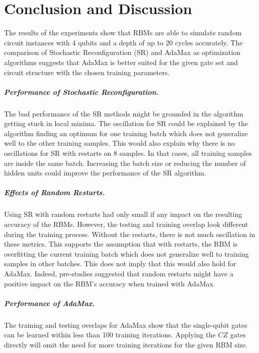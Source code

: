 \chapter{Conclusion and Discussion}
\label{sec:discussion}

The results of the experiments show that RBMs are able to simulate random circuit 
instances with 4 qubits and a depth of up to 20 cycles accurately. The comparison of 
Stochastic Reconfiguration (SR) and AdaMax as optimization algorithms suggests that 
AdaMax is better suited for the given gate set and circuit structure with the chosen training 
parameters. 

\paragraph{Performance of Stochastic Reconfiguration.}
The bad performance of the SR methods might be grounded in the algorithm getting stuck in 
local minima. The oscillation for SR could be explained by the algorithm finding an 
optimum for one training batch which does not generalize well to the other training samples.
This would also explain why there is no oscillations for SR with restarts on 8 samples. In that
cases, all training samples are inside the same batch. Increasing the batch size or reducing the 
number of hidden units could improve the performance of the SR algorithm.

\paragraph{Effects of Random Restarts.}
Using SR with random restarts had only small if any 
impact on the resulting accuracy of the RBMs. However, the testing and training overlap 
look different during the training process. Without the restarts, there is not much 
oscillation in these metrics. This supports the assumption that with restarts, the 
RBM is overfitting the current training batch which does not generalize well to training 
samples in other batches. This does not imply that this would also 
hold for AdaMax. Indeed, pre-studies suggested that random restarts might have a positive 
impact on the RBM's accuracy when trained with AdaMax.

\paragraph{Performance of AdaMax.}
The training and testing overlaps for AdaMax show that the single-qubit gates can 
be learned within less than 100 training iterations. Applying 
the $CZ$ gates directly will omit the need for more training iterations for the given RBM size.

